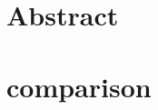 \newcommand{\figurescaling}{0.7}





\maketitle
\section{Abstract}
\newpage
\tableofcontents
\newpage


\newpage

\newpage


\newpage

\newpage

\newpage
\section{comparison}
\listoffigures
\listoftables






